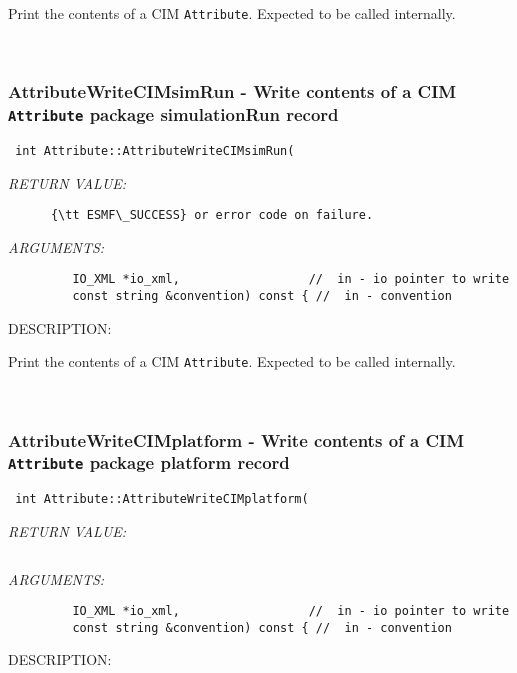       Print the contents of a CIM {\tt Attribute}.  Expected to be
      called internally.
   
 
\mbox{}\hrulefill\
 
\subsubsection [AttributeWriteCIMsimRun] {AttributeWriteCIMsimRun - Write contents of a CIM {\tt Attribute} package simulationRun record}


  
\begin{verbatim} int Attribute::AttributeWriteCIMsimRun(\end{verbatim}{\em RETURN VALUE:}
\begin{verbatim}      {\tt ESMF\_SUCCESS} or error code on failure.\end{verbatim}{\em ARGUMENTS:}
\begin{verbatim}         IO_XML *io_xml,                  //  in - io pointer to write
         const string &convention) const { //  in - convention\end{verbatim}
{\sf DESCRIPTION:\\ }


      Print the contents of a CIM {\tt Attribute}.  Expected to be
      called internally.
   
 
\mbox{}\hrulefill\
 
\subsubsection [AttributeWriteCIMplatform] {AttributeWriteCIMplatform - Write contents of a CIM {\tt Attribute} package platform record}


  
\begin{verbatim} int Attribute::AttributeWriteCIMplatform(\end{verbatim}{\em RETURN VALUE:}
\begin{verbatim} \end{verbatim}{\em ARGUMENTS:}
\begin{verbatim}         IO_XML *io_xml,                  //  in - io pointer to write
         const string &convention) const { //  in - convention\end{verbatim}
{\sf DESCRIPTION:\\ }


